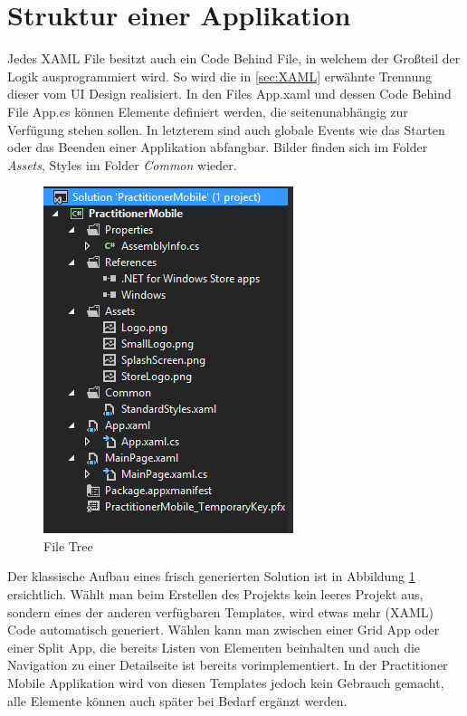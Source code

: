 \documentclass[a4paper,bibtotoc,oneside]{scrbook}
\begin{document}
\section{Struktur einer Applikation}
Jedes XAML File besitzt auch ein Code Behind File, in welchem der Großteil der Logik ausprogrammiert wird. So wird die in \ref{sec:XAML} erwähnte Trennung dieser vom UI Design realisiert.
\newline
\newline
In den Files App.xaml und dessen Code Behind File App.cs können Elemente definiert werden, die seitenunabhängig zur Verfügung stehen sollen. In letzterem sind auch globale Events wie das Starten oder das Beenden einer Applikation abfangbar.
\newline
\newline
Bilder finden sich im Folder \textit{Assets}, Styles im Folder \textit{Common} wieder.
\newline
\begin{figure}[htbp]
\centering
\includegraphics[scale=1]{images/filetree.png}
\caption[File Tree eines neu erzeugten Windows 8 / Windows RT Projekts]{File Tree}\label{Abb3}
\end{figure}
\newline
Der klassische Aufbau eines frisch generierten Solution ist in Abbildung \ref{Abb3} ersichtlich.
\newpage
Wählt man beim Erstellen des Projekts kein leeres Projekt aus, sondern eines der anderen verfügbaren Templates, wird etwas mehr (XAML) Code automatisch generiert. Wählen kann man zwischen einer Grid App oder einer Split App, die bereits Listen von Elementen beinhalten und auch die Navigation zu einer Detailseite ist bereits vorimplementiert. In der Practitioner Mobile Applikation wird von diesen Templates jedoch kein Gebrauch gemacht, alle Elemente können auch später bei Bedarf ergänzt werden.
\end{document}
